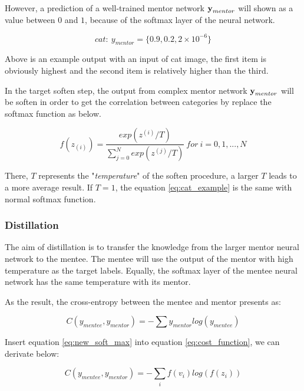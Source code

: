 \documentclass[article]{aaltoseries}
\begin{document}
However, a prediction of a well-trained mentor network \(\textbf y_{mentor}\) will shown as a value between 
\(0\) and \(1\), because of the softmax layer of the neural network. 

\begin{equation} \label{eq:cat_example}
  cat:\ y_{mentor} = \{0.9,0.2,2 \times 10^{-6}\}
\end{equation}

Above is an example output with an input of cat image, 
the first item is obviously highest and the second item is relatively higher than the third.


In the target soften step, 
the output from complex mentor network \(\textbf y_{mentor}\) will be soften in order to get the correlation between categories
by replace the softmax function as below.

\begin{equation} \label{eq:new_soft_max}
  f(z_{(i)}) = \frac{exp(z^{(i)}/T)}{\sum_{j=0}^{N}exp(z^{(j)}/T)}\ for\ i=0,1,...,N
\end{equation}

There, \(T\) represents the "\emph{temperature}" of the soften procedure, a larger \(T\) leads to a more average result. 
If \(T =1\), the equation \ref{eq:cat_example} is the same with normal softmax function. 


\subsubsection{Distillation}

The aim of distillation is to transfer the knowledge from the larger mentor neural network to the mentee. 
The mentee will use the output of the mentor with high temperature as the target labels.
Equally, the softmax layer of the mentee neural network has the same temperature with its mentor.

As the result, the cross-entropy between the mentee and mentor presents as:

\begin{equation} \label{eq:cost_function}
  C(y_{mentee}, y_{mentor}) = - \sum y_{mentor}log(y_{mentee})
\end{equation}

Insert equation \ref{eq:new_soft_max} into equation \ref{eq:cost_function}, we can derivate below:

\begin{equation} \label{eq:cost_function1}
  C(y_{mentee}, y_{mentor}) = - \sum_i f(v_i)log(f(z_i))
\end{equation}
\end{document}
